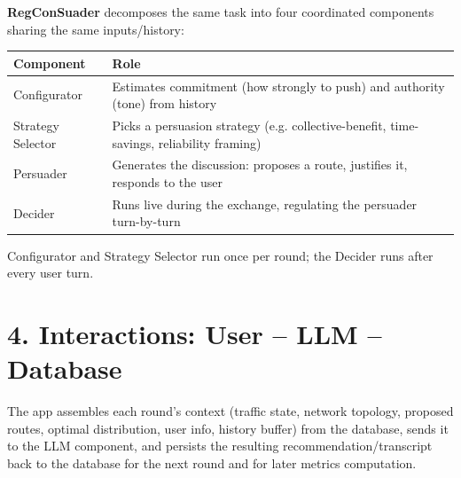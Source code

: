 \documentclass[10pt]{article}
\begin{document}
\textbf{RegConSuader} decomposes the same task into four coordinated components sharing the same inputs/history:
\begin{center}
\small
\begin{tabular}{@{}ll@{}}
\toprule
\textbf{Component} & \textbf{Role} \\
\midrule
Configurator & Estimates commitment (how strongly to push) and authority (tone) from history \\
Strategy Selector & Picks a persuasion strategy (e.g. collective-benefit, time-savings, reliability framing) \\
Persuader & Generates the discussion: proposes a route, justifies it, responds to the user \\
Decider & Runs live during the exchange, regulating the persuader turn-by-turn \\
\bottomrule
\end{tabular}
\end{center}
Configurator and Strategy Selector run once per round; the Decider runs after every user turn.

\section*{4. Interactions: User -- LLM -- Database}
\begin{center}
\end{center}
The app assembles each round's context (traffic state, network topology, proposed routes, optimal distribution, user info, history buffer) from the database, sends it to the LLM component, and persists the resulting recommendation/transcript back to the database for the next round and for later metrics computation.
\end{document}
